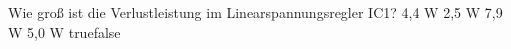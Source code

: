     {Wie groß ist die Verlustleistung im Linearspannungsregler IC1?}
    {4,4 W}
    {2,5 W}
    {7,9 W }
    {5,0 W}
    {true}{false}